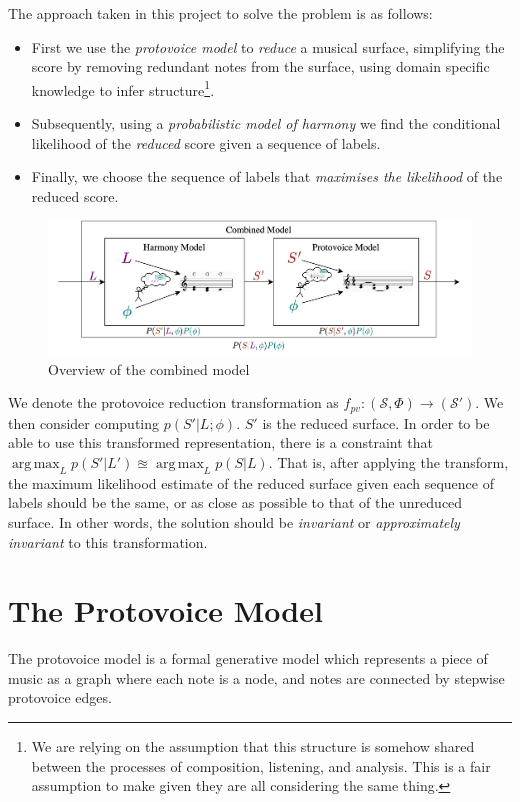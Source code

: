 \documentclass[12pt,a4paper,twoside,openright]{report}
\DeclareMathOperator*{\argmax}{arg\,max}
\theoremstyle{definition}
\begin{document}
The approach taken in this project to solve the problem is as follows:

\begin{itemize}
  \item First we use the \textit{protovoice model} to \textit{reduce} a musical surface, simplifying the score by removing redundant notes from the surface, using domain specific knowledge to infer structure\footnote{We are relying on the assumption that this structure is somehow shared between the processes of composition, listening, and analysis. This is a fair assumption to make given they are all considering the same thing.}. 
  \item Subsequently, using a \textit{probabilistic model of harmony} we find the conditional likelihood of the \textit{reduced} score given a sequence of labels.
  \item Finally, we choose the sequence of labels that \textit{maximises the likelihood} of the reduced score.
\end{itemize}

\begin{figure}
  \centering
  \includegraphics[width=\textwidth]{intro/inferenceOverview}
  \caption{Overview of the combined model}
  \label{fig:inferenceOverview}
\end{figure}



We denote the protovoice reduction transformation as $f_{pv}:(\mathcal{S}, \Phi) \to (\mathcal{S'})$.
We then consider computing $p(S'|L;\phi)$. $S'$ is the reduced surface. In order to be able to use this transformed representation, there is a constraint that $\argmax_L p(S'|L') \approxeq \argmax_L p(S|L)$. That is, after applying the transform, the maximum likelihood estimate of the reduced surface given each sequence of labels should be the same, or as close as possible to that of the unreduced surface. In other words, the solution should be \textit{invariant} or \textit{approximately invariant} to this transformation.

\section{The Protovoice Model}
The protovoice model is a formal generative model which represents a piece of music as a graph where each note is a node, and notes are connected by stepwise protovoice edges. 
\end{document}
